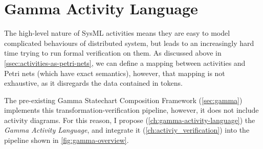 \chapter{Gamma Activity Language}\label{ch:gamma-activity-language}

The high-level nature of SysML activities means they are easy to model complicated behaviours of distributed system, but leads to an increasingly hard time trying to run formal verification on them. As discussed above in \autoref{ssec:activities-as-petri-nets}, we can define a mapping between activities and Petri nets (which have exact semantics), however, that mapping is not exhaustive, as it disregards the data contained in tokens.

The pre-existing Gamma Statechart Composition Framework (\autoref{sec:gamma}) implements this transformation-verification pipeline, however, it does not include activity diagrams. For this reason, I propose (\autoref{ch:gamma-activity-language}) the \emph{Gamma Activity Language}, and integrate it (\autoref{ch:activiy_verification}) into the pipeline shown in \autoref{fig:gamma-overview}.




